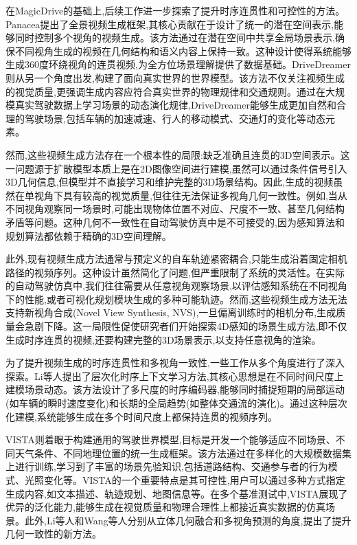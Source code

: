 在MagicDrive的基础上,后续工作进一步探索了提升时序连贯性和可控性的方法。Panacea\cite{wen2024panacea}提出了全景视频生成框架,其核心贡献在于设计了统一的潜在空间表示,能够同时控制多个视角的视频生成。该方法通过在潜在空间中共享全局场景表示,确保不同视角生成的视频在几何结构和语义内容上保持一致。这种设计使得系统能够生成360度环绕视角的连贯视频,为全方位场景理解提供了数据基础。DriveDreamer\cite{wang2024drivedreamer}则从另一个角度出发,构建了面向真实世界的世界模型。该方法不仅关注视频生成的视觉质量,更强调生成内容应符合真实世界的物理规律和交通规则。通过在大规模真实驾驶数据上学习场景的动态演化规律,DriveDreamer能够生成更加自然和合理的驾驶场景,包括车辆的加速减速、行人的移动模式、交通灯的变化等动态元素。

然而,这些视频生成方法存在一个根本性的局限:缺乏准确且连贯的3D空间表示。这一问题源于扩散模型本质上是在2D图像空间进行建模,虽然可以通过条件信号引入3D几何信息,但模型并不直接学习和维护完整的3D场景结构。因此,生成的视频虽然在单视角下具有较高的视觉质量,但往往无法保证多视角几何一致性。例如,当从不同视角观察同一场景时,可能出现物体位置不对应、尺度不一致、甚至几何结构矛盾等问题。这种几何不一致性在自动驾驶仿真中是不可接受的,因为感知算法和规划算法都依赖于精确的3D空间理解。

此外,现有视频生成方法通常与预定义的自车轨迹紧密耦合,只能生成沿着固定相机路径的视频序列。这种设计虽然简化了问题,但严重限制了系统的灵活性。在实际的自动驾驶仿真中,我们往往需要从任意视角观察场景,以评估感知系统在不同视角下的性能,或者可视化规划模块生成的多种可能轨迹。然而,这些视频生成方法无法支持新视角合成(Novel View Synthesis, NVS),一旦偏离训练时的相机分布,生成质量会急剧下降。这一局限性促使研究者们开始探索4D感知的场景生成方法,即不仅生成时序连贯的视频,还要构建完整的3D场景表示,以支持任意视角的渲染。

为了提升视频生成的时序连贯性和多视角一致性,一些工作从多个角度进行了深入探索\cite{li2024hierarchical,gao2025vista,li2023bridging,wang2024driving}。Li等人\cite{li2024hierarchical}提出了层次化时序上下文学习方法,其核心思想是在不同时间尺度上建模场景动态。该方法设计了多尺度的时序编码器,能够同时捕捉短期的局部运动(如车辆的瞬时速度变化)和长期的全局趋势(如整体交通流的演化)。通过这种层次化建模,系统能够生成在多个时间尺度上都保持连贯的视频序列。

VISTA\cite{gao2025vista}则着眼于构建通用的驾驶世界模型,目标是开发一个能够适应不同场景、不同天气条件、不同地理位置的统一生成框架。该方法通过在多样化的大规模数据集上进行训练,学习到了丰富的场景先验知识,包括道路结构、交通参与者的行为模式、光照变化等。VISTA的一个重要特点是其可控性,用户可以通过多种方式指定生成内容,如文本描述、轨迹规划、地图信息等。在多个基准测试中,VISTA展现了优异的泛化能力,能够生成在视觉质量和物理合理性上都接近真实数据的仿真场景。此外,Li等人\cite{li2023bridging}和Wang等人\cite{wang2024driving}分别从立体几何融合和多视角预测的角度,提出了提升几何一致性的新方法。

